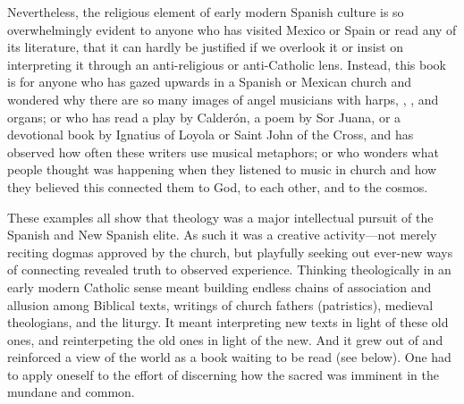 Nevertheless, the religious element of early modern Spanish culture is so
overwhelmingly evident to anyone who has visited Mexico or Spain or read any of
its literature, that it can hardly be justified if we overlook it or insist on
interpreting it through an anti-religious or anti-Catholic lens.
Instead, this book is for anyone who has gazed upwards in a Spanish or Mexican
church and wondered why there are so many images of angel musicians with harps,
, , and organs; or who has read a play by
Calderón, a poem by Sor Juana, or a devotional book by Ignatius of Loyola or
Saint John of the Cross, and has observed how often these writers use musical
metaphors; or who wonders what people thought was happening when they listened
to music in church and how they believed this connected them to God, to each
other, and to the cosmos.

These examples all show that theology was a major intellectual pursuit of the
Spanish and New Spanish elite.
As such it was a creative activity---not merely reciting dogmas
approved by the church, but playfully seeking out ever-new ways of connecting
revealed truth to observed experience.
Thinking theologically in an early modern Catholic sense meant building 
endless chains of association and allusion among Biblical texts, writings of
church fathers (patristics), medieval theologians, and the liturgy. 
It meant interpreting new texts in light of these old ones, and reinterpeting
the old ones in light of the new.
And it grew out of and reinforced a view of the world as a book waiting to be
read (see below).
One had to apply oneself to the effort of discerning how the sacred was
imminent in the mundane and common.%

